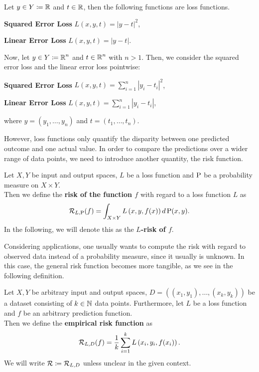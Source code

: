 \begin{example}
Let $y\in Y\coloneqq \operatorname{\mathbb{R}}$ and $t\in \operatorname{\mathbb{R}}$, then the following functions are loss functions.
\begin{mydescription}{}
\item[\textbf{Squared Error Loss}] $L(x, y, t) = \left|y - t\right|^2$,
\item[\textbf{Linear Error Loss}]  $L(x, y, t) = \left|y - t\right|$.
\end{mydescription}
Now, let $y\in Y \coloneqq \operatorname{\mathbb{R}}^n$ and $t\in\operatorname{\mathbb{R}}^n$ with $n>1$. Then, we consider the squared error loss and the linear error loss pointwise:
\begin{mydescription}{}
\item[\textbf{Squared Error Loss}] $L(x, y, t) = \sum_{i=1}^n\left|y_i - t_i\right|^2$,
\item[\textbf{Linear Error Loss}]  $L(x, y, t) = \sum_{i=1}^n\left|y_i - t_i\right|$,
\end{mydescription}
where $y = (y_1,\ldots, y_n)$ and $t = (t_1,\ldots, t_n)$.
\end{example}


However, loss functions only quantify the disparity between one predicted outcome and one actual value. In order to compare the predictions over a wider range of data points, we need to introduce another quantity, the risk function.


\begin{definition}\label{def_risk}
Let $X,Y$ be input and output spaces, $L$ be a loss function and $\operatorname{\text{P}}$ be a probability measure on $X \times Y$.\\
Then we define the \textbf{risk of the function $f$} with regard to a loss function $L$ as
\begin{align*}
\operatorname{\mathcal{R}}_{L, \operatorname{\text{P}}}(f) = \int_{X\times Y} L\left(x, y, f(x) \right) d \operatorname{\text{P}}(x, y).
\end{align*}
In the following, we will denote this as the \textbf{$L$-risk of $f$}.
\end{definition}


Considering applications, one usually wants to compute the risk with regard to observed data instead of a probability measure, since it usually is unknown. In this case, the general risk function becomes more tangible, as we see in the following definition.


\begin{definition}\label{def_empirical_risk}
Let $X, Y$ be arbitrary input and output spaces, $D = \left((x_1,y_1), \ldots, (x_k,y_k)\right)$ be a dataset consisting of $k\in\operatorname{\mathbb{N}}$ data points. Furthermore, let $L$ be a loss function and $f$ be an arbitrary prediction function.\\
Then we define the \textbf{empirical risk function} as
\begin{align}
\operatorname{\mathcal{R}}_{L, D} (f) = \frac{1}{k} \sum_{i=1}^{k} L\left(x_i, y_i, f(x_i)\right).
\end{align}
We will write $\operatorname{\mathcal{R}} \coloneqq \operatorname{\mathcal{R}}_{L, D}$ unless unclear in the given context.
\end{definition}


